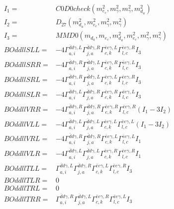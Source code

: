 \documentclass[A4,landscape]{article}
\begin{document}
\begin{align} 
I_1 = & C0D0check(m^2_{e_{{c}}}, m^2_{\gamma}, m^2_{\gamma}, m^2_{d_{{a}}}) \\ 
I_2 = & D_{27}(m^2_{d_{{a}}}, m^2_{e_{{c}}}, m^2_{\gamma}, m^2_{\gamma}) \\ 
I_3 = & MMD0(m_{d_{{a}}}, m_{e_{{c}}}, m^2_{d_{{a}}}, m^2_{e_{{c}}}, m^2_{\gamma}, m^2_{\gamma}) \\ 
  BOddllSLL= & -4  \Gamma^{\bar{d}d \gamma ,L}_{a, i} \Gamma^{\bar{d}d \gamma ,R}_{j, a} \Gamma^{\bar{e}e \gamma ,L}_{c, k} \Gamma^{\bar{e}e \gamma ,R}_{l, c} I_3 \\ 
  BOddllSRR= & -4  \Gamma^{\bar{d}d \gamma ,R}_{a, i} \Gamma^{\bar{d}d \gamma ,L}_{j, a} \Gamma^{\bar{e}e \gamma ,R}_{c, k} \Gamma^{\bar{e}e \gamma ,L}_{l, c} I_3 \\ 
  BOddllSRL= & -4  \Gamma^{\bar{d}d \gamma ,R}_{a, i} \Gamma^{\bar{d}d \gamma ,L}_{j, a} \Gamma^{\bar{e}e \gamma ,L}_{c, k} \Gamma^{\bar{e}e \gamma ,R}_{l, c} I_3 \\ 
  BOddllSLR= & -4  \Gamma^{\bar{d}d \gamma ,L}_{a, i} \Gamma^{\bar{d}d \gamma ,R}_{j, a} \Gamma^{\bar{e}e \gamma ,R}_{c, k} \Gamma^{\bar{e}e \gamma ,L}_{l, c} I_3 \\ 
  BOddllVRR= & -4  \Gamma^{\bar{d}d \gamma ,R}_{a, i} \Gamma^{\bar{d}d \gamma ,R}_{j, a} \Gamma^{\bar{e}e \gamma ,R}_{c, k} \Gamma^{\bar{e}e \gamma ,R}_{l, c} (I_1 - 3 I_2) \\ 
  BOddllVLL= & -4  \Gamma^{\bar{d}d \gamma ,L}_{a, i} \Gamma^{\bar{d}d \gamma ,L}_{j, a} \Gamma^{\bar{e}e \gamma ,L}_{c, k} \Gamma^{\bar{e}e \gamma ,L}_{l, c} (I_1 - 3 I_2) \\ 
  BOddllVRL= & -4  \Gamma^{\bar{d}d \gamma ,R}_{a, i} \Gamma^{\bar{d}d \gamma ,R}_{j, a} \Gamma^{\bar{e}e \gamma ,L}_{c, k} \Gamma^{\bar{e}e \gamma ,L}_{l, c} I_1 \\ 
  BOddllVLR= & -4  \Gamma^{\bar{d}d \gamma ,L}_{a, i} \Gamma^{\bar{d}d \gamma ,L}_{j, a} \Gamma^{\bar{e}e \gamma ,R}_{c, k} \Gamma^{\bar{e}e \gamma ,R}_{l, c} I_1 \\ 
  BOddllTLL= &  \Gamma^{\bar{d}d \gamma ,L}_{a, i} \Gamma^{\bar{d}d \gamma ,R}_{j, a} \Gamma^{\bar{e}e \gamma ,L}_{c, k} \Gamma^{\bar{e}e \gamma ,R}_{l, c} I_3 \\ 
  BOddllTLR= & 0 \\ 
  BOddllTRL= & 0 \\ 
  BOddllTRR= &  \Gamma^{\bar{d}d \gamma ,R}_{a, i} \Gamma^{\bar{d}d \gamma ,L}_{j, a} \Gamma^{\bar{e}e \gamma ,R}_{c, k} \Gamma^{\bar{e}e \gamma ,L}_{l, c} I_3 \\ 
\end{align} 
\end{document}
